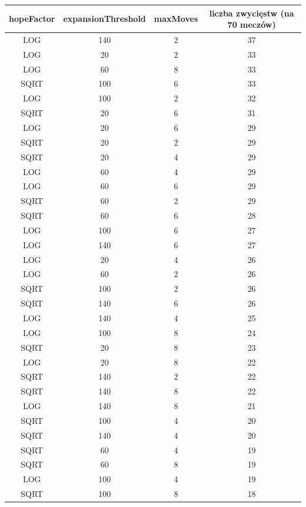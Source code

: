 \documentclass{pracamgr}
\begin{document}
\begin{appendices}
\begin{center}
    \begin{tabular}{| c | c | c | c |}
	\hline
    hopeFactor & expansionThreshold & maxMoves & liczba zwycięstw (na 70 meczów) \\ \hline
	\hline
        LOG & 140 & 2 & 37 \\ \hline
        LOG & 20 & 2 & 33 \\ \hline
        LOG & 60 & 8 & 33 \\ \hline
        SQRT & 100 & 6 & 33 \\ \hline
        LOG & 100 & 2 & 32 \\ \hline
        SQRT & 20 & 6 & 31 \\ \hline
        LOG & 20 & 6 & 29 \\ \hline
        SQRT & 20 & 2 & 29 \\ \hline
        SQRT & 20 & 4 & 29 \\ \hline
        LOG & 60 & 4 & 29 \\ \hline
        LOG & 60 & 6 & 29 \\ \hline
        SQRT & 60 & 2 & 29 \\ \hline
        SQRT & 60 & 6 & 28 \\ \hline
        LOG & 100 & 6 & 27 \\ \hline
        LOG & 140 & 6 & 27 \\ \hline
        LOG & 20 & 4 & 26 \\ \hline
        LOG & 60 & 2 & 26 \\ \hline
        SQRT & 100 & 2 & 26 \\ \hline
        SQRT & 140 & 6 & 26 \\ \hline
        LOG & 140 & 4 & 25 \\ \hline
        LOG & 100 & 8 & 24 \\ \hline
        SQRT & 20 & 8 & 23 \\ \hline
        LOG & 20 & 8 & 22 \\ \hline
        SQRT & 140 & 2 & 22 \\ \hline
        SQRT & 140 & 8 & 22 \\ \hline
        LOG & 140 & 8 & 21 \\ \hline
        SQRT & 100 & 4 & 20 \\ \hline
        SQRT & 140 & 4 & 20 \\ \hline
        SQRT & 60 & 4 & 19 \\ \hline
        SQRT & 60 & 8 & 19 \\ \hline
        LOG & 100 & 4 & 19 \\ \hline
        SQRT & 100 & 8 & 18 \\ \hline


\end{tabular}
\end{center}
\end{appendices}
\end{document}
